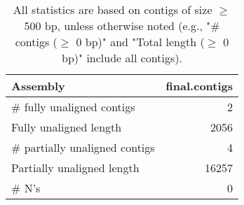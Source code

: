 \documentclass[12pt,a4paper]{article}
\begin{document}
\begin{table}[ht]
\begin{center}
\caption{All statistics are based on contigs of size $\geq$ 500 bp, unless otherwise noted (e.g., "\# contigs ($\geq$ 0 bp)" and "Total length ($\geq$ 0 bp)" include all contigs).}
\begin{tabular}{|l*{1}{|r}|}
\hline
Assembly & final.contigs \\ \hline
\# fully unaligned contigs & 2 \\ \hline
Fully unaligned length & 2056 \\ \hline
\# partially unaligned contigs & 4 \\ \hline
Partially unaligned length & 16257 \\ \hline
\# N's & 0 \\ \hline
\end{tabular}
\end{center}
\end{table}
\end{document}
